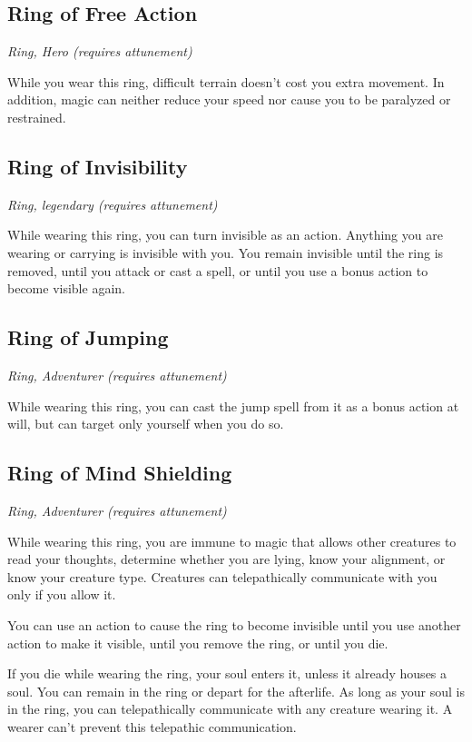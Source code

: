 \subsection{Ring of Free Action}
\textit{Ring, Hero (requires attunement)}

While you wear this ring, difficult terrain doesn't cost you extra movement. In addition, magic can neither reduce your speed nor cause you to be paralyzed or restrained.

\subsection{Ring of Invisibility}
\textit{Ring, legendary (requires attunement)}

While wearing this ring, you can turn invisible as an action. Anything you are wearing or carrying is invisible with you. You remain invisible until the ring is removed, until you attack or cast a spell, or until you use a bonus action to become visible again.

\subsection{Ring of Jumping}
\textit{Ring, Adventurer (requires attunement)}

While wearing this ring, you can cast the jump spell from it as a bonus action at will, but can target only yourself when you do so.

\subsection{Ring of Mind Shielding}
\textit{Ring, Adventurer (requires attunement)}

While wearing this ring, you are immune to magic that allows other creatures to read your thoughts, determine whether you are lying, know your alignment, or know your creature type. Creatures can telepathically communicate with you only if you allow it.

You can use an action to cause the ring to become invisible until you use another action to make it visible, until you remove the ring, or until you die.

If you die while wearing the ring, your soul enters it, unless it already houses a soul. You can remain in the ring or depart for the afterlife. As long as your soul is in the ring, you can telepathically communicate with any creature wearing it. A wearer can't prevent this telepathic communication.


